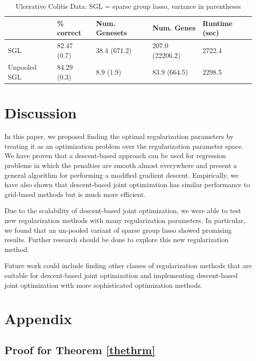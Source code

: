 \documentclass[10pt,letterpaper]{article}
\begin{document}
\begin{table}
\begin{center}
\begin{tabular}{| l | l | l | l | l | }
\hline
 & \% correct  & Num. Genesets & Num. Genes & Runtime (sec) \\
\hline
SGL & 82.47 (0.7) & 38.4 (671.2) & 207.0 (22206.2) & 2722.4 \\
\hline
Unpooled SGL & 84.29 (0.3) & 8.9 (1.9) & 83.9 (664.5) & 2298.5 \\
\hline
\end{tabular}
\end{center}
\caption {Ulcerative Colitis Data: SGL = sparse group lasso, variance in parentheses}
\label{colitis}
\end{table}

\section{Discussion}
In this paper, we proposed finding the optimal regularization parameters by treating it as an optimization problem over the regularization parameter space. We have proven that a descent-based approach can be used for regression problems in which the penalties are smooth almost everywhere and present a general algorithm for performing a modified gradient descent. Empirically, we have also shown that descent-based joint optimization has similar performance to grid-based methods but is much more efficient.

Due to the scalability of descent-based joint optimization, we were able to test new regularization methods with many regularization parameters. In particular, we found that an un-pooled variant of sparse group lasso showed promising results. Further research should be done to explore this new regularization method.

Future work could include finding other classes of regularization methods that are suitable for descent-based joint optimization and implementing descent-based joint optimization with more sophisticated optimization methods.

\section*{Appendix}

\subsection{Proof for Theorem \ref{thethrm}}
\end{document}

